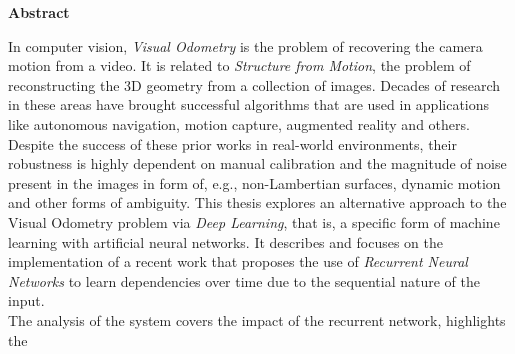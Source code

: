 \thispagestyle{empty}
\vspace{8cm}
\noindent
{\centerline {\bf \large Abstract}}
\vspace{1cm}
\noindent

In computer vision, \emph{Visual Odometry} is the problem of recovering the camera motion from a video.
It is related to \emph{Structure from Motion}, the problem of reconstructing the 3D geometry from a collection of images.
Decades of research in these areas have brought successful algorithms that are used in applications like autonomous navigation, motion capture, augmented reality and others.
Despite the success of these prior works in real-world environments, their robustness is highly dependent on manual calibration and the magnitude of noise present in the images in form of, e.g.\@, non-Lambertian surfaces, dynamic motion and other forms of ambiguity.
This thesis explores an alternative approach to the Visual Odometry problem via \emph{Deep Learning}, that is, a specific form of machine learning with artificial neural networks.
It describes and focuses on the implementation of a recent work that proposes the use of \emph{Recurrent Neural Networks} to learn dependencies over time due to the sequential nature of the input.
\\
The analysis of the system covers the impact of the recurrent network, highlights the 